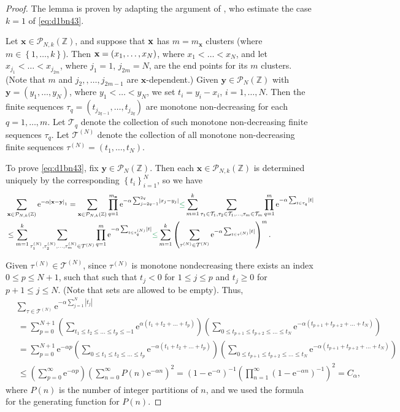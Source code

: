 \documentclass[12pt, a4paper,reqno]{amsart}
\newcommand{\fg}{\color{ForestGreen}}
\numberwithin{equation}{section}
\newcommand\Z{\mathbb Z}
\newcommand\cT{\mathcal{T}}
\newcommand\x{\mathbf{x}}
\newcommand\y{\mathbf{y}}
\newcommand\e{\mathrm{e}}
\newcommand\cP{\mathcal{P}}
\newcommand\be{\begin{equation}\begin{aligned}}
\newcommand\ee{\end{aligned}\end{equation}}
\newcommand{\abs}[1]{\left\lvert #1 \right\rvert}
\newcommand{\set}[1]{\left\{ #1 \right\}}
\newcommand{\pa}[1]{\left( #1 \right)}
\newcommand{\up}[1]{^{\left(#1\right)}}
\begin{document}
\begin{proof}
The lemma is proven by adapting the argument of  \cite[Lemma B.2]{BeW},   who estimate the case $k=1$ of  \eqref{eq:d1bn43}.

Let $\x \in \cP_{N,k}(\Z)$, and  suppose that ${\bf x}$ has $m=m_\x$ clusters (where $m\in\set{1,\ldots,k}$). Then   ${\bf x}=(x_1, \ldots, x_N)$, where  $x_1< \ldots < x_N$, and let  $x_{j_1}< \ldots <x_{j_{2m}}$, where $j_1=1$, $j_{2m}=N$, are the end points for its $m$ clusters. (Note that  $m$ and  $j_2,,\ldots,j_{2m-1}$ are $\x$-dependent.) Given  $\y \in \cP_{N}(\Z)$  with $\y=(y_1, \ldots,y_N)$, 
where  $y_1<\ldots<y_N$, we set $t_i=y_i-x_i$,
 $i=1,\ldots,N$. Then the finite sequences  $\tau_{q}=(t_{j_{2q-1}},\ldots, t_{j_{2q}})$ are monotone non-decreasing for each  $q=1,\ldots,m$.   Let $\cT_{q}$ denote the collection of such monotone non-decreasing finite sequences $\tau_{q}$. Let $\cT\up{N}$ denote the collection of all monotone non-decreasing finite sequences $\tau\up{N}=(t_1,\ldots,t_N)$. 
 
 To prove \eqref{eq:d1bn43}, fix  $\y \in \cP_{N}(\Z)$.  Then each $\x \in \cP_{N,k}(\Z)$ is determined uniquely by the corresponding $\set{t_i}_{i=1}^N$, so we have 
 \be\label{appA19}
&\sum_{{\x}\in\cP_{N,k}(\Z)} \e^{-\alpha \abs{\x-\y}_1}=\sum_{{\x}\in\cP_{N,k}(\Z)}\prod_{q=1}^{m_\x}
\e^{-\alpha \sum_{j=2q-1}^{2q} \abs{x_j-y_j}}    {\fg \le }
\sum _{m=1}^k \sum_{ \tau_1\in \cT_{1}, \tau_2\in \cT_{1},\ldots, \tau_m\in\cT_{m} }     \prod_{q=1}^m \e^{-\alpha \sum_{t\in \tau_q} \abs{t}} 
\\  & \le  \sum _{m=1}^k \sum_{ \tau\up{N}_1,\tau\up{N}_2,\ldots,  \tau\up{N}_m\in\cT\up{N} }     \prod_{q=1}^m \e^{-\alpha \sum_{t\in \tau\up{N}_q} \abs{t}} {\fg \le}\sum _{m=1}^k  \pa{\sum_{\tau\up{N}\in\cT\up{N}} \e^{-\alpha \sum_{t\in \tau\up{N}} \abs{t}}}^m.
\ee

Given $\tau\up{N} \in \cT\up{N}$, since $\tau\up{N}$ is monotone nondecreasing   there exists an index $0\le p\le N+1$, such that 
 such that   $t_{j}< 0$ for $1\le  j\le  p$ and $t_{j}\ge 0$ for  $ {p}+1\le j\le  N$.
(Note that sets are allowed to be empty). Thus,
\be\label{appA29}
&\sum_{\tau \in \cT\up{N}}
\e^{-\alpha \sum_{j=1}^{N} \abs{t_{j}}}\\
& \  = \sum_{p=0}^{N+1}\pa{\sum_{t_1\le t_2\le \ldots \le t_p\le -1} \e^{\alpha (t_1 +t_2+\ldots +t_p)}}\pa{\sum_{0\le t_{p+1}\le t_{p+2}\le \ldots \le t_{N}} \e^{-\alpha (t_{p+1}+ t_{p+2}+\ldots +t_{N})}}\\
& \ = \sum_{p=0}^{N+1} \e^{-\alpha  p}\pa{\sum_{0\le t_1\le t_2\le \ldots \le t_p} \e^{-\alpha (t_1 +t_2+\ldots +t_p)}}\pa{\sum_{0\le t_{p+1}\le t_{p+2}\le \ldots \le t_{N}} \e^{-\alpha (t_{p+1}+ t_{p+2}+\ldots +t_{N})}}\\
&  \ \le  \pa{ \sum_{p=0}^{\infty} \e^{-\alpha  p}}  \pa{  \sum_{n=0}^\infty  P(n)    \e^{-\alpha  n} }^2
 =   (1-\e^{-\alpha})^{-1} \pa{ \prod_{n=1}^\infty (1- \e^{-\alpha n})^{-1}}^2=C_\alpha,
\ee
where $P(n) $ is the number of  integer partitions of $n$, and we used 
the formula for the generating function for $P(n) $.


\end{proof}
\end{document}
